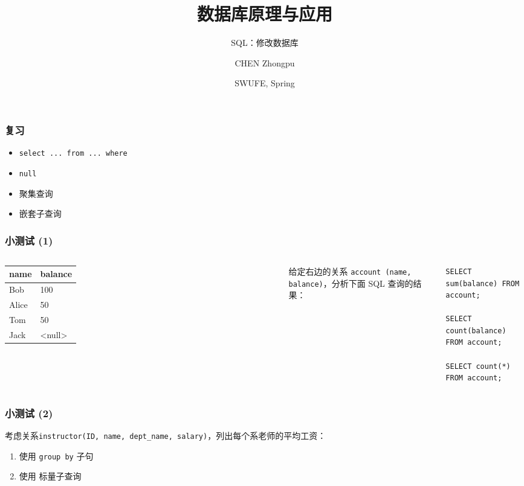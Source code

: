 \documentclass[aspectratio=169, 14pt]{beamer}
\title[Database Principles and Applications] %
{数据库原理与应用}
\subtitle{SQL：修改数据库}
\author[CHEN Zhongpu] %
{CHEN Zhongpu}
\institute[] %
{
  School of Computing and Artificial Intelligence \\
  \href{mailto:zpchen@swufe.edu.cn}{zpchen@swufe.edu.cn}
}
\date[] %
{SWUFE, Spring \the\year{}}
\begin{document}
\frame{\titlepage}

\begin{frame}
	\frametitle{复习}
	\begin{itemize}
		\item \texttt{select ... from ... where}
		\item \texttt{null}
		\item 聚集查询
		\item 嵌套子查询
	\end{itemize}
\end{frame}

\begin{frame}[fragile]
	\frametitle{小测试 (1)}

	\begin{columns}
		\begin{table}
			\begin{tabular}{ll}
				\toprule
				name  & balance \\
				\midrule
				Bob   & 100     \\
				Alice & 50      \\
				Tom   & 50      \\
				Jack  & <null>  \\
				\bottomrule
			\end{tabular}
		\end{table}
		给定右边的关系 \texttt{account (name, balance)}，分析下面 SQL 查询的结果：

		\begin{verbatim} 
SELECT sum(balance) FROM account;

SELECT count(balance) FROM account;

SELECT count(*) FROM account;
    \end{verbatim}

	\end{columns}

\end{frame}

\begin{frame}
	\frametitle{小测试 (2)}
	考虑关系\texttt{instructor(ID, name, dept\_name, salary)}，列出每个系老师的平均工资：

	\begin{enumerate}
		\item 使用 \texttt{group by} 子句
		\item 使用 标量子查询
	\end{enumerate}

\end{frame}
\end{document}

